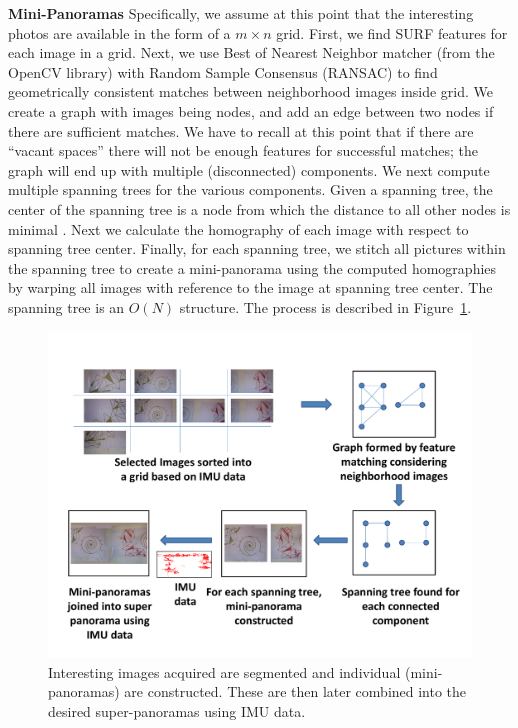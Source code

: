 {\bf Mini-Panoramas} Specifically, we assume at this point that the
interesting photos are available in the form of a $m \times n$
grid. First, we find SURF \cite{Bay} features for each image in a
grid. Next, we use Best of Nearest Neighbor matcher (from the OpenCV
library) with Random Sample Consensus (RANSAC) \cite{Fischler1981} to
find geometrically consistent matches between neighborhood images
inside grid.  We create a graph with images being nodes, and add an
edge between two nodes if there are sufficient matches. We have to
recall at this point that if there are ``vacant spaces'' there will
not be enough features for successful matches; the graph will end up
with multiple (disconnected) components.  We next compute multiple
spanning trees for the various components. Given a spanning tree, the
center of the spanning tree is a node from which the distance to all
other nodes is minimal \cite{Kocay}. Next we calculate the homography
of each image with respect to spanning tree center.  Finally, for each
spanning tree, we stitch all pictures within the spanning tree to
create a mini-panorama using the computed homographies by warping all
images with reference to the image at spanning tree center. The
spanning tree is an $O(N)$ structure. The process is described in
Figure~\ref{fig:graph}.

\begin{figure}[t!]
  \centering
  \includegraphics[width=\textwidth]{figures/graphCreation} 
  \caption[Creation of Mini-panoramas]{ \label{fig:graph} Interesting images
  acquired are segmented and individual (mini-panoramas) are constructed. These
    are then later combined into the desired super-panoramas using IMU data.}
\end{figure}    

